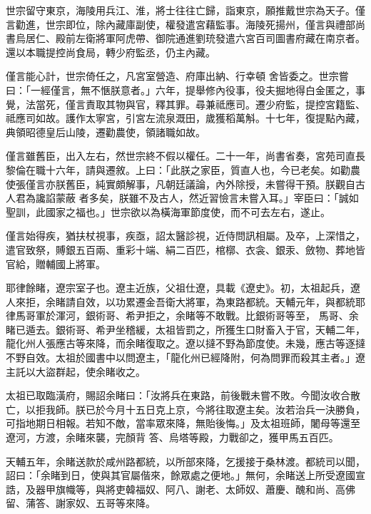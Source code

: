 \begin{pinyinscope}
 世宗留守東京，海陵用兵江、淮，將士往往亡歸，詣東京，願推戴世宗為天子。僅言勸進，世宗即位，除內藏庫副使，權發遣宮藉監事。海陵死揚州，僅言與禮部尚書烏居仁、殿前左衛將軍阿虎帶、御院通進劉珫發遣六宮百司圖書府藏在南京者。還以本職提控尚食局，轉少府監丞，仍主內藏。



 僅言能心計，世宗倚任之，凡宮室營造、府庫出納、行幸頓
 舍皆委之。世宗嘗曰：「一經僅言，無不愜朕意者。」六年，提舉修內役事，役夫掘地得白金匿之，事覺，法當死，僅言責取其物與官，釋其罪。尋兼祗應司。遷少府監，提控宮籍監、祗應司如故。護作太寧宮，引宮左流泉溉田，歲獲稻萬斛。十七年，復提點內藏，典領昭德皇后山陵，遷勸農使，領諸職如故。



 僅言雖舊臣，出入左右，然世宗終不假以權任。二十一年，尚書省奏，宮苑司直長黎倫在職十六年，請與遷敘。上曰：「此朕之家臣，質直人也，今已老矣。如勸農使張僅言亦朕舊臣，純實頗解事，凡朝廷議論，內外除授，未嘗得干預。朕觀自古人君為讒諂蒙蔽
 者多矣，朕雖不及古人，然近習憸言未嘗入耳。」宰臣曰：「誠如聖訓，此國家之福也。」世宗欲以為橫海軍節度使，而不可去左右，遂止。



 僅言始得疾，猶扶杖視事，疾亟，詔太醫診視，近侍問訊相屬。及卒，上深惜之，遣官致祭，賻銀五百兩、重彩十端、絹二百匹，棺槨、衣衾、銀汞、斂物、葬地皆官給，贈輔國上將軍。



 耶律餘睹，遼宗室子也。遼主近族，父祖仕遼，具載《遼史》。初，太祖起兵，遼人來拒，余睹請自效，以功累遷金吾衛大將軍，為東路都統。天輔元年，與都統耶律馬哥軍於渾河，銀術哥、希尹拒之，余睹等不敢戰。比銀術哥等至，
 馬哥、余睹已遁去。銀術哥、希尹坐稽緩，太祖皆罰之，所獲生口財畜入于官，天輔二年，龍化州人張應古等來降，而余睹復取之。遼以撻不野為節度使。未幾，應古等逐撻不野自效。太祖於國書中以問遼主，「龍化州已經降附，何為問罪而殺其主者。」遼主託以大盜群起，使余睹收之。



 太祖已取臨潢府，賜詔余睹曰：「汝將兵在東路，前後戰未嘗不敗。今聞汝收合散亡，以拒我師。朕已於今月十五日克上京，今將往取遼主矣。汝若治兵一決勝負，可指地期日相報。若知不敵，當率眾來降，無貽後悔。」及太祖班師，闍母等還至遼河，方渡，余睹來襲，完顏背
 答、烏塔等殿，力戰卻之，獲甲馬五百匹。



 天輔五年，余睹送款於咸州路都統，以所部來降，乞援接于桑林渡。都統司以聞，詔曰：「余睹到日，使與其官屬偕來，餘眾處之便地。」無何，余睹送上所受遼國宣誥，及器甲旗幟等，與將吏韓福奴、阿八、謝老、太師奴、蕭慶、醜和尚、高佛留、蒲答、謝家奴、五哥等來降。




\end{pinyinscope}
